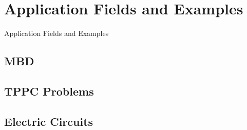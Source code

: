 
\section{Application Fields and Examples}

\begin{frame}{Application Fields and Examples}{}
\end{frame}

\subsection{\acl{MBD}}

\subsection{\acl{TPPC} Problems}

\subsection{Electric Circuits}


